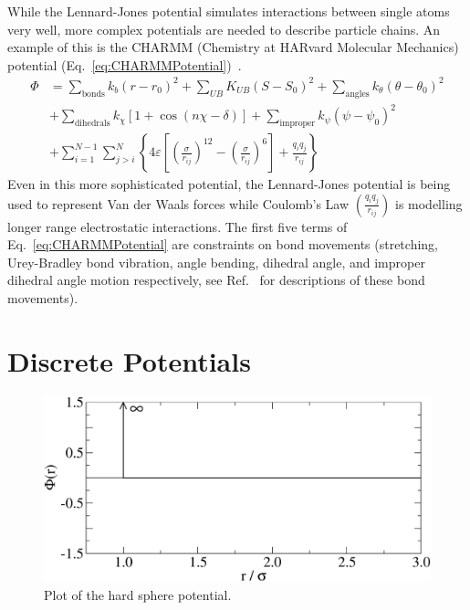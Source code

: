 \documentclass[12pt]{UoAthesis} \usepackage{booktabs}
\begin{document}
While the Lennard-Jones potential simulates interactions between
single atoms very well, more complex potentials are needed to describe
particle chains.  An example of this is the CHARMM (Chemistry at
HARvard Molecular Mechanics) potential
(Eq.~\eqref{eq:CHARMMPotential})~\cite{MacKerell1998}.  
\begin{align}
  \label{eq:CHARMMPotential}
  \Phi &= \sum_{\text{bonds}}k_b(r-r_0)^2  
  + \sum_{UB}K_{UB}(S-S_0)^2 
  + \sum_{\text{angles}}k_\theta(\theta - \theta_0)^2 \nonumber\\
  &+ \sum_{\text{dihedrals}} k_\chi[1+\cos(n\chi - \delta)] 
  + \sum_{\text{improper}} k_\psi(\psi - \psi_0)^2 \nonumber\\
  &+ \sum_{i=1}^{N-1}\sum_{j>i}^{N}\left\{ 4 \varepsilon 
    \left[ \left( \frac{\sigma}{r_{ij}} \right)^{12}
      -\left( \frac{\sigma}{r_{ij}} \right)^{6} \right] 
    + \frac{q_iq_j}{r_{ij}}\right\}
\end{align}
Even in this more sophisticated potential, the Lennard-Jones potential
is being used to represent Van der Waals forces while Coulomb's Law
$\left(\frac{q_iq_j}{r_{ij}}\right)$ is modelling longer range
electrostatic interactions.  The first five terms of
Eq.~\eqref{eq:CHARMMPotential} are constraints on bond movements
(stretching, Urey-Bradley bond vibration, angle bending, dihedral
angle, and improper dihedral angle motion respectively, see
Ref.~\cite{Spoel2010} for descriptions of these bond movements).


\section{Discrete Potentials}

\begin{figure}[htp] 
  \begin{center}
    \includegraphics[clip,scale=0.45]{figures/hardsphere} 
    \caption[Hard sphere potential]{\label{fig:hardSphere} Plot of the
      hard sphere potential.}
  \end{center}
\end{figure}
\end{document}
